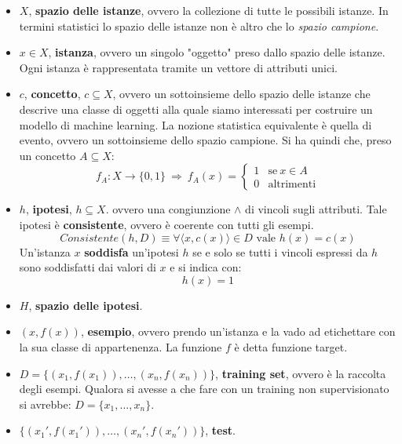 \begin{itemize}
    \item $X$, \textbf{spazio delle istanze}, ovvero la collezione di tutte le possibili istanze. In termini statistici lo spazio delle istanze non è altro che lo \textit{spazio campione}.
    \item $x \in X$, \textbf{istanza}, ovvero un singolo "oggetto" preso dallo spazio delle istanze. Ogni istanza è rappresentata tramite un vettore di attributi unici.
    \item $c$, \textbf{concetto}, $c \subseteq X$, ovvero un sottoinsieme dello spazio delle istanze che descrive una classe di oggetti alla quale siamo interessati per costruire un modello di machine learning. La nozione statistica equivalente è quella di evento, ovvero un sottoinsieme dello spazio campione. Si ha quindi che, preso un concetto $A \subseteq X$:
    \begin{equation}
        f_A: X \to \{0, 1\} \ \Longrightarrow \ f_A(x) = \begin{cases} 1 & \text{se} \ x \in A \\ 0 & \text{altrimenti}\end{cases}
    \end{equation}
    \item $h$, \textbf{ipotesi}, $h \subseteq X$. ovvero una congiunzione $\land$ di vincoli sugli attributi. Tale ipotesi è \textbf{consistente}, ovvero è coerente con tutti gli esempi.
    \begin{equation}
        Consistente(h, D) \equiv \forall \langle x, c(x) \rangle \in D \text{ vale } h(x) = c(x)
    \end{equation}
    Un'istanza $x$ \textbf{soddisfa} un'ipotesi $h$ se e solo se tutti i vincoli espressi da $h$ sono soddisfatti dai valori di $x$ e si indica con: 
    \begin{equation}
        h(x) = 1
    \end{equation}
    \item $H$, \textbf{spazio delle ipotesi}.
    \item $(x, f(x))$, \textbf{esempio}, ovvero prendo un'istanza e la vado ad etichettare con la sua classe di appartenenza. La funzione $f$ è detta funzione target.
    \item $D = \{(x_1, f(x_1)), \dots, (x_n, f(x_n))\}$, \textbf{training set}, ovvero è la raccolta degli esempi. Qualora si avesse a che fare con un training non supervisionato si avrebbe: $D = \{x_1, \dots, x_n\}$.
    \item $\{(x_1', f(x_1')), \dots, (x_n', f(x_n'))\}$, \textbf{test}.

\end{itemize}
